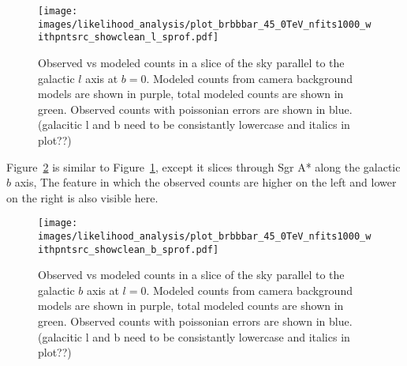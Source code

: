   \begin{figure}[h]
    \centering
    \texttt{[image: images/likelihood\_analysis/plot\_brbbbar\_45\_0TeV\_nfits1000\_withpntsrc\_showclean\_l\_sprof.pdf]}
    \caption[Galactic Center Profile vs Galactic $l$]{
      Observed vs modeled counts in a slice of the sky parallel to the galactic $l$ axis at $b=0$.
      Modeled counts from camera background models are shown in purple, total modeled counts are shown in green.
      Observed counts with poissonian errors are shown in blue.
      {\color{red}(galacitic l and b need to be consistantly lowercase and italics in plot??)}
    }
    \label{fig:gc_profile_gal_l}
  \end{figure}

  Figure~\ref{fig:gc_profile_gal_b} is similar to Figure~\ref{fig:gc_profile_gal_l}, except it slices through Sgr A* along the galactic $b$ axis,
  The feature in which the observed counts are higher on the left and lower on the right is also visible here.

  \begin{figure}[h]
    \centering
    \texttt{[image: images/likelihood\_analysis/plot\_brbbbar\_45\_0TeV\_nfits1000\_withpntsrc\_showclean\_b\_sprof.pdf]}
    \caption[Galactic Center Profile vs Galactic $b$]{
      Observed vs modeled counts in a slice of the sky parallel to the galactic $b$ axis at $l=0$.
      Modeled counts from camera background models are shown in purple, total modeled counts are shown in green.
      Observed counts with poissonian errors are shown in blue.
      {\color{red}(galacitic l and b need to be consistantly lowercase and italics in plot??)}
    }
    \label{fig:gc_profile_gal_b}
  \end{figure}

